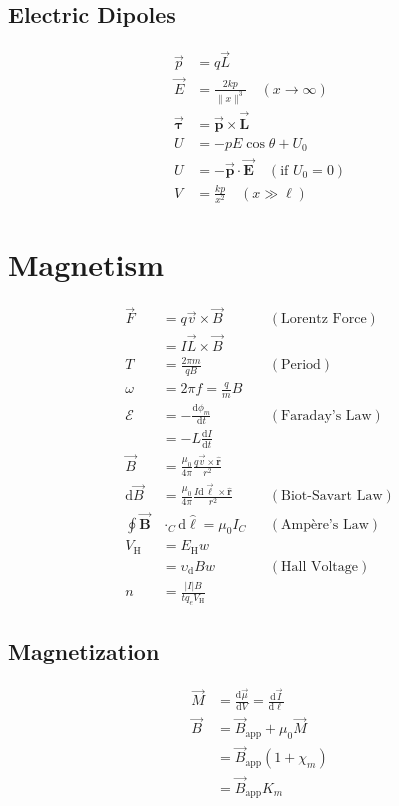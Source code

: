 \documentclass[10pt]{article}
\newcommand{\id}[1]{\mathrm{d} #1}
\newcommand{\bvec}[1]{\vec{\mathbf{#1}}}
\newcommand{\buvec}[1]{\hat{\mathbf{#1}}}
\begin{document}
\begin{multicols*}{5}
\subsection{Electric Dipoles}
\begin{align*}
    \vec{p} &= q\vec{L}\\
    \vec{E} &= \frac{2kp}{\|x\|^3} \quad (x \to \infty)\\
    \vec{\boldsymbol{\tau}} &= \bvec{p} \times \bvec{L}\\
    U &= -pE\cos \theta + U_0\\
    U &= -\bvec{p} \cdot \bvec{E} \quad (\text{if $U_0 = 0$})\\
    V &= \frac{kp}{x^2} \quad (x \gg \ell)
\end{align*}

\section{Magnetism}

\begin{align*}
    \vec{F} &= q\vec{v} \times \vec{B} && (\text{Lorentz Force})\\
      &= I\vec{L} \times \vec{B}\\
    T &= \frac{2\pi m}{qB} && (\text{Period})\\
    \omega &= 2\pi f = \frac{q}{m}B\\
    \mathcal{E} &= -\frac{\id{\phi_m}}{\id{t}} && (\text{Faraday's
	Law})\\
                &= -L \frac{\id{I}}{\id{t}}\\
    \vec{B} &= \frac{\mu_0}{4\pi} \frac{q\vec{v} \times \buvec{r}}
    {r^2}\\
    \id{\vec{B}} &= \frac{\mu_0}{4\pi} \frac{I\id{\vec{\ell}} \times
    \buvec{r}} {r^2} && (\text{Biot-Savart Law})\\
    \oint \bvec{B} &\cdot_C \id{\buvec{\ell}} = \mu_0 I_C &&
    (\text{Amp\`{e}re's Law})\\
    V_\mathrm{H} &= E_\mathrm{H} w \\
    &= \upsilon_\mathrm{d}Bw && (\text{Hall Voltage})\\
    n &= \frac{|I|B}{tq_eV_\mathrm{H}}
\end{align*}

\subsection{Magnetization}

\begin{align*}
    \vec{M} &= \frac{\id{\vec{\mu}}}{\id V} =
    \frac{\id{\vec{I}}}{\id{\ell}}\\
    \vec{B} &= \vec{B}_\text{app} + \mu_0 \vec{M}\\
	    &= \vec{B}_\text{app} (1 + \chi_m)\\
	    &= \vec{B}_\text{app} K_m
\end{align*}


\end{multicols*}
\end{document}
